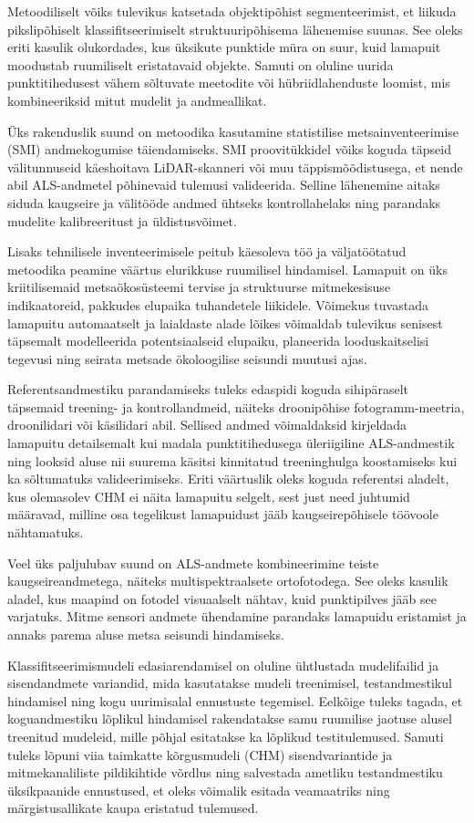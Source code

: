 Metoodiliselt võiks tulevikus katsetada objektipõhist segmenteerimist, et liikuda pikslipõhiselt klassifitseerimiselt struktuuripõhisema lähenemise suunas. See oleks eriti kasulik olukordades, kus üksikute punktide müra on suur, kuid lamapuit moodustab ruumiliselt eristatavaid objekte. Samuti on oluline uurida punktitihedusest vähem sõltuvate meetodite või hübriidlahenduste loomist, mis kombineeriksid mitut mudelit ja andmeallikat.

Üks rakenduslik suund on metoodika kasutamine statistilise metsainventeerimise (SMI) andmekogumise täiendamiseks. SMI proovitükkidel võiks koguda täpseid välitunnuseid käeshoitava LiDAR-skanneri või muu täppismõõdistusega, et nende abil ALS-andmetel põhinevaid tulemusi valideerida. Selline lähenemine aitaks siduda kaugseire ja välitööde andmed ühtseks kontrollahelaks ning parandaks mudelite kalibreeritust ja üldistusvõimet.

Lisaks tehnilisele inventeerimisele peitub käesoleva töö ja väljatöötatud metoodika peamine väärtus elurikkuse ruumilisel hindamisel. Lamapuit on üks kriitilisemaid metsaökosüsteemi tervise ja struktuurse mitmekesisuse indikaatoreid, pakkudes elupaika tuhandetele liikidele. Võimekus tuvastada lamapuitu automaatselt ja laialdaste alade lõikes võimaldab tulevikus senisest täpsemalt modelleerida potentsiaalseid elupaiku, planeerida looduskaitselisi tegevusi ning seirata metsade ökoloogilise seisundi muutusi ajas.

Referentsandmestiku parandamiseks tuleks edaspidi koguda sihipäraselt täpsemaid treening- ja kontrollandmeid, näiteks droonipõhise fotogramm-meetria, droonilidari või käsilidari abil. Sellised andmed võimaldaksid kirjeldada lamapuitu detailsemalt kui madala punktitihedusega üleriigiline ALS-andmestik ning looksid aluse nii suurema käsitsi kinnitatud treeninghulga koostamiseks kui ka sõltumatuks valideerimiseks. Eriti väärtuslik oleks koguda referentsi aladelt, kus olemasolev CHM ei näita lamapuitu selgelt, sest just need juhtumid määravad, milline osa tegelikust lamapuidust jääb kaugseirepõhisele töövoole nähtamatuks.

Veel üks paljulubav suund on ALS-andmete kombineerimine teiste kaugseireandmetega, näiteks multispektraalsete ortofotodega. See oleks kasulik aladel, kus maapind on fotodel visuaalselt nähtav, kuid punktipilves jääb see varjatuks. Mitme sensori andmete ühendamine parandaks lamapuidu eristamist ja annaks parema aluse metsa seisundi hindamiseks.

Klassifitseerimismudeli edasiarendamisel on oluline ühtlustada mudelifailid ja sisendandmete variandid, mida kasutatakse mudeli treenimisel, testandmestikul hindamisel ning kogu uurimisalal ennustuste tegemisel. Eelkõige tuleks tagada, et koguandmestiku lõplikul hindamisel rakendatakse samu ruumilise jaotuse alusel treenitud mudeleid, mille põhjal esitatakse ka lõplikud testitulemused. Samuti tuleks lõpuni viia taimkatte kõrgusmudeli (CHM) sisendvariantide ja mitmekanaliliste pildikihtide võrdlus ning salvestada ametliku testandmestiku üksikpaanide ennustused, et oleks võimalik esitada veamaatriks ning märgistusallikate kaupa eristatud tulemused.

